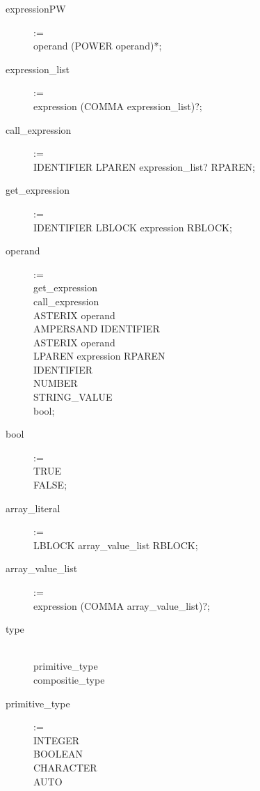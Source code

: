 \begin{description}
    \item[expressionPW] := \hfill \\
        operand (POWER operand)*;
    \item[expression\_list] := \hfill \\
        expression (COMMA expression\_list)?;
    \item[call\_expression] := \hfill \\
        IDENTIFIER LPAREN expression\_list? RPAREN;
    \item[get\_expression] := \hfill \\
        IDENTIFIER LBLOCK expression RBLOCK; 
    \item[operand \\] := \hfill \\
        get\_expression \textbar \\
        call\_expression \textbar \\
        ASTERIX operand \textbar \\
        AMPERSAND IDENTIFIER \textbar \\
        ASTERIX operand \textbar \\
        LPAREN expression RPAREN \textbar \\
        IDENTIFIER \textbar \\
        NUMBER \textbar \\
        STRING\_VALUE \textbar \\
        bool;
    \item[bool] := \hfill \\
        TRUE  \textbar \\
        FALSE;
    \item[array\_literal] := \hfill \\
        LBLOCK array\_value\_list RBLOCK;
    \item[array\_value\_list] := \hfill \\
        expression (COMMA array\_value\_list)?;
    \item[type] \hfill \\
        primitive\_type \\
        compositie\_type
    \item[primitive\_type] := \hfill \\
        INTEGER \textbar \\
        BOOLEAN \textbar \\
        CHARACTER \textbar \\
        AUTO \textbar \\

\end{description}
